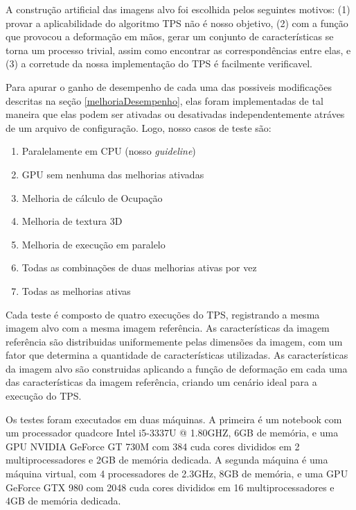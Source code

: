   A construção artificial das imagens alvo foi escolhida pelos seguintes motivos:
(1) provar a aplicabilidade do algoritmo TPS não é nosso objetivo, (2) com a
função que provocou a deformação em mãos, gerar um conjunto de características
se torna um processo trivial, assim como encontrar as correspondências entre
elas, e (3) a corretude da nossa implementação do TPS é facilmente verificavel.

  Para apurar o ganho de desempenho de cada uma das possiveis modificações
descritas na seção \ref{melhoriaDesempenho}, elas foram implementadas de tal
maneira que elas podem ser ativadas ou desativadas independentemente atráves de
um arquivo de configuração. Logo, nosso casos de teste são:

\begin{enumerate}
  \item Paralelamente em CPU (nosso \textit{guideline})
  \item GPU sem nenhuma das melhorias ativadas
  \item Melhoria de cálculo de Ocupação
  \item Melhoria de textura 3D
  \item Melhoria de execução em paralelo
  \item Todas as combinações de duas melhorias ativas por vez
  \item Todas as melhorias ativas
\end{enumerate}

  Cada teste é composto de quatro execuções do TPS, registrando a mesma imagem
alvo com a mesma imagem referência. As características da imagem referência
são distribuidas uniformemente pelas dimensões da imagem, com um fator que
determina a quantidade de características utilizadas. As características da
imagem alvo são construidas aplicando a função de deformação em cada uma das
características da imagem referência, criando um cenário ideal para a execução
do TPS.

  Os testes foram executados em duas máquinas. A primeira é um notebook com
um processador quadcore Intel i5-3337U @ 1.80GHZ, 6GB de memória, e uma GPU
NVIDIA GeForce GT 730M com 384 cuda cores divididos em 2 multiprocessadores e
2GB de memória dedicada. A segunda máquina é uma máquina virtual, com 4
processadores de 2.3GHz, 8GB de memória, e uma GPU GeForce GTX 980 com 2048
cuda cores divididos em 16 multiprocessadores e 4GB de memória dedicada.

